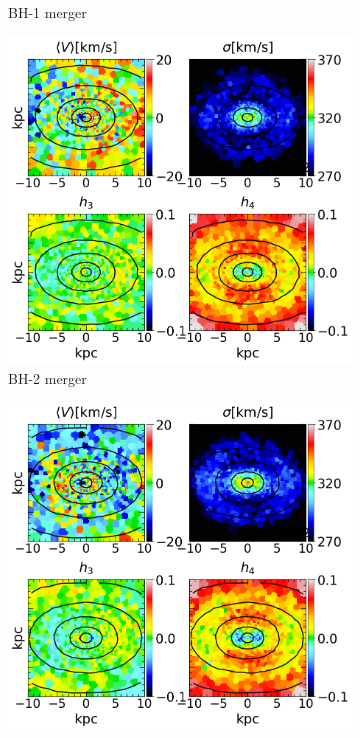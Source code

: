 \documentclass[english, oneside]{HYgradu}
\begin{document}
\begin{figure}
\begin{subfigure}[b]{0.49\textwidth}
		\caption{BH-1 merger}
	\end{subfigure}
	\begin{subfigure}[b]{0.49\textwidth}
		\includegraphics[width=\textwidth]{BH_3.png}
		\caption{BH-2 merger}
	\end{subfigure}
	\begin{subfigure}[b]{0.49\textwidth}
		\includegraphics[width=\textwidth]{BH_4.png}

\end{subfigure}
\end{figure}
\end{document}
